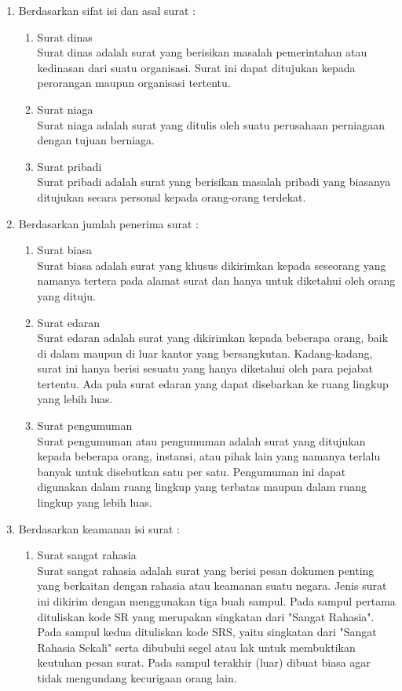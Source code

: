 \begin{enumerate}
\begin{enumerate}
	\end{enumerate}
	\item Berdasarkan sifat isi dan asal surat :
	\begin{enumerate}
		\item Surat dinas \\
		Surat dinas adalah surat yang berisikan masalah pemerintahan atau kedinasan dari suatu organisasi. Surat ini dapat ditujukan kepada perorangan maupun organisasi tertentu. 
		\item Surat niaga \\
		Surat niaga adalah surat yang ditulis oleh suatu perusahaan perniagaan dengan tujuan berniaga. 
		\item Surat pribadi \\
		Surat pribadi adalah surat yang berisikan masalah pribadi yang biasanya ditujukan secara personal kepada orang-orang terdekat.
	\end{enumerate}
	\item Berdasarkan jumlah penerima surat :
	\begin{enumerate}
		\item Surat biasa \\
		Surat biasa adalah surat yang khusus dikirimkan kepada seseorang yang namanya tertera pada alamat surat dan hanya untuk diketahui oleh orang yang dituju.
		\item Surat edaran \\
		Surat edaran adalah surat yang dikirimkan kepada beberapa orang, baik di dalam maupun di luar kantor yang bersangkutan. Kadang-kadang, surat ini hanya berisi sesuatu yang hanya diketahui oleh para pejabat tertentu. Ada pula surat edaran yang dapat disebarkan ke ruang lingkup yang lebih luas.
		\item Surat pengumuman \\
		Surat pengumuman atau pengumuman adalah surat yang ditujukan kepada beberapa orang, instansi, atau pihak lain yang namanya terlalu banyak untuk disebutkan satu per satu. Pengumuman ini dapat digunakan dalam ruang lingkup yang terbatas maupun dalam ruang lingkup yang lebih luas. 
	\end{enumerate}
	\item Berdasarkan keamanan isi surat :
	\begin{enumerate}
		\item Surat sangat rahasia \\
		Surat sangat rahasia adalah surat yang berisi pesan dokumen penting yang berkaitan dengan rahasia atau keamanan suatu negara. Jenis surat ini dikirim dengan menggunakan tiga buah sampul. Pada sampul pertama dituliskan kode SR yang merupakan singkatan dari "Sangat Rahasia". Pada sampul kedua dituliskan kode SRS, yaitu singkatan dari "Sangat Rahasia Sekali" serta dibubuhi segel atau lak untuk membuktikan keutuhan pesan surat. Pada sampul terakhir (luar) dibuat biasa agar tidak mengundang kecurigaan orang lain. 

\end{enumerate}
\end{enumerate}
